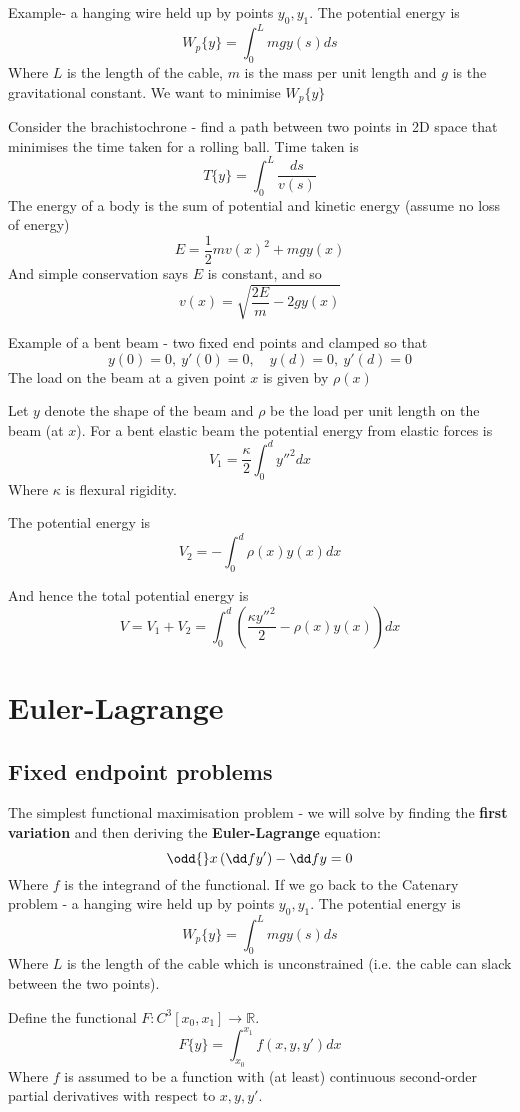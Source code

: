 \documentclass{X:/Documents/Coding/Latex/myassignment}
\begin{document}
Example- a hanging wire held up by points $y_0,y_1$. The potential energy is
\[W_p\{y\} = \int_0^L mgy(s) ds\]
Where $L$ is the length of the cable, $m$ is the mass per unit length and $g$ is the gravitational constant.
We want to minimise $W_p\{y\}$

Consider the brachistochrone - find a path between two points in 2D space that minimises the time taken for a rolling ball.
Time taken is
\[T\{y\} = \int_0^L \frac{ds}{v(s)}\]
The energy of a body is the sum of potential and kinetic energy (assume no loss of energy)
\[E = \frac12 m v(x)^2 + mg y(x)\]
And simple conservation says $E$ is constant, and so
\[v(x) = \sqrt{\frac{2E}{m} - 2gy(x)}\]

Example of a bent beam - two fixed end points and clamped so that
\[y(0) = 0,\ y'(0) = 0, \quad y(d) = 0 , \ y'(d) = 0\]
The load on the beam at a given point $x$ is given by $\rho(x)$

Let $y$ denote the shape of the beam and $\rho$ be the load per unit length on the beam (at $x$).
For a bent elastic beam the potential energy from elastic forces is
\[V_1 = \frac \kappa 2 \int_0^d y''^2 dx\]
Where $\kappa$ is flexural rigidity.

The potential energy is
\[V_2 = -\int_0^d \rho(x) y(x) dx\]

And hence the total potential energy is
\[V = V_1 + V_2 = \int_0^d \left(\frac{\kappa y''^2}2 - \rho(x)y(x)\right) dx\]


\section{Euler-Lagrange}
\subsection{Fixed endpoint problems}
The simplest functional maximisation problem - we will solve by finding the \textbf{first variation} and then deriving the \textbf{Euler-Lagrange} equation:
\[\odd{}x \left(\dd f{y'}\right) - \dd fy = 0\]
Where $f$ is the integrand of the functional.
If we go back to the Catenary problem - a hanging wire held up by points $y_0,y_1$. The potential energy is
\[W_p\{y\} = \int_0^L mgy(s) ds\]
Where $L$ is the length of the cable which is unconstrained (i.e. the cable can slack between the two points).

Define the functional $F : C^3[x_0,x_1] \to \mathbb{R}$.
\[F\{y\} = \int_{x_0}^{x_1} f(x,y,y') dx\]
Where $f$ is assumed to be a function with (at least) continuous second-order partial derivatives with respect to $x,y,y'$.
\end{document}
